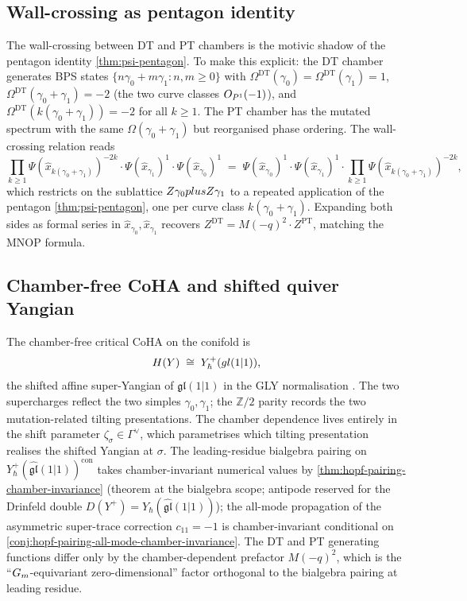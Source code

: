 \subsection{Wall-crossing as pentagon identity}

The wall-crossing between DT and PT chambers is the motivic shadow of
the pentagon identity \cref{thm:psi-pentagon}. To make this explicit:
the DT chamber generates BPS states $\{n \gamma_0 + m \gamma_1 : n, m \geq 0\}$
with
$\Omega^{\mathrm{DT}}(\gamma_0) = \Omega^{\mathrm{DT}}(\gamma_1) = 1$,
$\Omega^{\mathrm{DT}}(\gamma_0 + \gamma_1) = -2$ (the two curve classes
$O_{P^1}(-1)$), and $\Omega^{\mathrm{DT}}(k(\gamma_0 + \gamma_1)) = -2$
for all $k \geq 1$. The PT chamber has the mutated spectrum with the
same $\Omega(\gamma_0 + \gamma_1)$ but reorganised phase ordering.
The wall-crossing relation reads
\[
  \prod_{k \geq 1} \Psi(\hat{x}_{k(\gamma_0 + \gamma_1)})^{-2k}
  \cdot \Psi(\hat{x}_{\gamma_1})^{1} \cdot \Psi(\hat{x}_{\gamma_0})^{1}
  \;=\;
  \Psi(\hat{x}_{\gamma_0})^{1} \cdot \Psi(\hat{x}_{\gamma_1})^{1} \cdot \prod_{k \geq 1} \Psi(\hat{x}_{k(\gamma_0 + \gamma_1)})^{-2k},
\]
which restricts on the sublattice $Z\gamma_0 plus Z\gamma_1$ to a
repeated application of the pentagon \cref{thm:psi-pentagon}, one
per curve class $k(\gamma_0 + \gamma_1)$. Expanding both sides as
formal series in $\hat{x}_{\gamma_0}, \hat{x}_{\gamma_1}$ recovers
$Z^{\mathrm{DT}} = M(-q)^2 \cdot Z^{\mathrm{PT}}$, matching the MNOP
formula.

\subsection{Chamber-free CoHA and shifted quiver Yangian}

The chamber-free critical CoHA on the conifold is
\[
  H(Y) \;\cong\; Y^+_{\hbar}(gl(1|1)),
\]
the shifted affine super-Yangian of $\mathfrak{gl}(1|1)$ in the GLY
normalisation \cite{GalakhovLiYamazaki2021}. The two supercharges
reflect the two simples $\gamma_0, \gamma_1$; the $\mathbb Z/2$ parity
records the two mutation-related tilting presentations. The chamber
dependence lives entirely in the shift parameter
$\zeta_\sigma \in \Gamma^\vee$, which parametrises which tilting
presentation realises the shifted Yangian at $\sigma$. The leading-residue
bialgebra pairing on
$Y^+_{\hbar}(\widehat{\mathfrak{gl}}(1|1))^{\mathrm{con}}$ takes
chamber-invariant numerical values by
\cref{thm:hopf-pairing-chamber-invariance} (theorem at the bialgebra
scope; antipode reserved for the Drinfeld double
$D(Y^+) = Y_{\hbar}(\widehat{\mathfrak{gl}}(1|1))$); the all-mode propagation
of the asymmetric super-trace correction $c_{11} = -1$ is chamber-invariant
conditional on \cref{conj:hopf-pairing-all-mode-chamber-invariance}.
The DT and PT generating functions differ only by the
chamber-dependent prefactor $M(-q)^2$, which is the
``$G_m$-equivariant zero-dimensional'' factor orthogonal to the
bialgebra pairing at leading residue.

